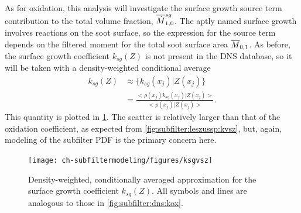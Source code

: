 

As for oxidation, this analysis will investigate the surface growth source term contribution to the total volume fraction, $\fst[M]{1,0}^{sg}$. The aptly named surface growth involves reactions on the soot surface, so the expression for the source term depends on the filtered moment for the total soot surface area $\mean{M}_{0,1}$. As before, the surface growth coefficient $k_{sg}(Z)$ is not present in the DNS database, so it will be taken with a density-weighted conditional average
\begin{equation}\label{eq:subfilter:dns:condksg}
  \begin{split}
    k_{sg}(Z) &\approx \{ k_{sg}(x_j)|Z(x_j) \} \\
    &= \frac{<\rho(x_j)k_{sg}(x_j)|Z(x_j)>}{<\rho(x_j)|Z(x_j)>}.
  \end{split}
\end{equation}
This quantity is plotted in \cref{fig:subfilter:dns:ksg}. The scatter is relatively larger than that of the oxidation coefficient, as expected from \cref{fig:subfilter:leszussp:kvsz}, but, again, modeling of the subfilter PDF is the primary concern here.


\begin{figure}[htb]
  \centering
  \texttt{[image: ch-subfiltermodeling/figures/ksgvsz]}
  \caption[Approximation for Surface Growth Coefficient, \texorpdfstring{$k_{sg}(Z)$}{ksg(Z)}]{Density-weighted, conditionally averaged approximation for the surface growth coefficient $k_{sg}(Z)$. All symbols and lines are analogous to those in \cref{fig:subfilter:dns:kox}.}
  \label{fig:subfilter:dns:ksg}
\end{figure}

